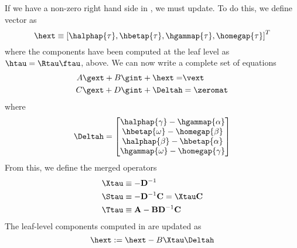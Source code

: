 If we have a non-zero right hand side in , we must update.  To do this, we define vector \hext as
\begin{equation}
\hext \equiv \left[\halphap{\tau}, \hbetap{\tau} , \hgammap{\tau}, \homegap{\tau}\right]^T 
\end{equation}
where the components have been computed at the leaf level as $\htau = \Rtau \ftau$, above.   We can now write a complete set of equations
\begin{equation}
\begin{aligned}
A\gext + B\gint + \hext = & \vext \\
C\gext + D\gint + \Deltah & = \zeromat
\end{aligned}
\end{equation}
where
\begin{equation}
\Deltah = 
\begin{bmatrix}
\halphap{\gamma} - \hgammap{\alpha} \\
\hbetap{\omega} - \homegap{\beta} \\
\halphap{\beta} - \hbetap{\alpha} \\
\hgammap{\omega} - \homegap{\gamma}
\end{bmatrix}
\end{equation}
From this, we define the merged operators
\begin{align}
    \Xtau & \equiv -\mathbf{D}^{-1} \label{eqs:merged_operators_X} \\
    \Stau & \equiv -\mathbf{D}^{-1} \mathbf{C}  = \Xtau \mathbf{C}
    \label{eqs:merged_operators_S}\\
    \Ttau & \equiv \mathbf{A} - \mathbf{B} \mathbf{D}^{-1} \mathbf{C} 
    \label{eqs:merged_operators_T}
\end{align}
The leaf-level components \hext computed in  are updated as
\begin{equation}
\hext := \hext - B\Xtau\Deltah
\end{equation}


